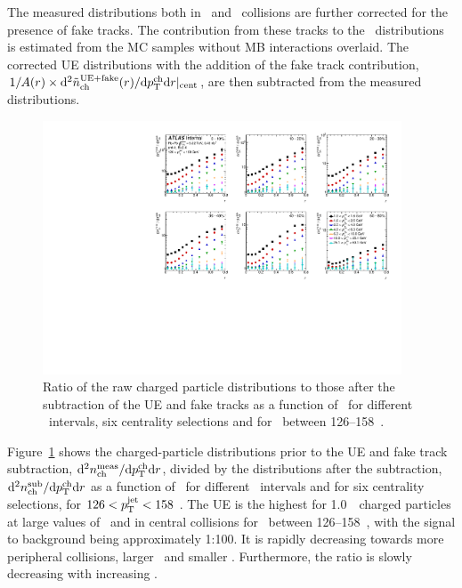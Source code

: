 The measured distributions both in \pp\ and \PbPb\ collisions are further corrected for the presence of fake tracks. The contribution from these tracks to the \Dptr\ distributions
is estimated from the MC samples without MB interactions overlaid. 
The corrected UE distributions with the addition of the fake track contribution, $1/A(r) \times \mathrm{d}^2 \mbox{$\tilde{n}_{\mathrm{ch}}^{\mathrm{UE+fake}}$} (r) / \mathrm{d} \mbox{$p_{\mathrm{T}}^{\mathrm{ch}}$} \mathrm{d} r |_{\mathrm{cent}}$, are then subtracted from the measured distributions.


\begin{figure}
\centerline{
 \includegraphics[width=0.95\textwidth]{figures/performance/UE_B2S_single_0.pdf}
}
\caption{
Ratio of the raw charged particle distributions to those after the subtraction of the UE
   and fake tracks as a function of \rvar\ for different \pttrk\ intervals, six centrality selections and for \ptjet\ between 126--158~\GeV.    
  }
\label{fig:UEsize}
\end{figure}

Figure~\ref{fig:UEsize} shows the charged-particle distributions prior to the UE and fake track subtraction, $ \mathrm{d}^2 \mbox{$n_{\mathrm{ch}}^{\mathrm{meas}}$} / \mathrm{d} \mbox{$p_{\mathrm{T}}^{\mathrm{ch}}$} \mathrm{d} r$, divided by the distributions after the subtraction, $ \mathrm{d}^2 \mbox{$n_{\mathrm{ch}}^{\mathrm{sub}}$} / \mathrm{d} \mbox{$p_{\mathrm{T}}^{\mathrm{ch}}$} \mathrm{d} r $ as a function of \rvar\ for different \pttrk\ intervals and for six centrality selections, for $126 < \mbox{$p_{\mathrm{T}}^{\mathrm{jet}}$} < 158$ \GeV. The UE is the highest for 1.0~\GeV\ charged particles at large values of \rvar\ and in central collisions for \ptjet\ between 126--158~\GeV, with the signal to background being approximately 1:100. It is rapidly decreasing towards more peripheral collisions, larger \pttrk\ and smaller \rvar.
Furthermore, the ratio is slowly decreasing with increasing \ptjet.

